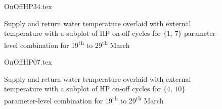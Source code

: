 \begin{figure}[htb]
    \centering
    {OnOffHP34.tex}
    \vspace*{-1.8\baselineskip}
    \caption[Supply and return water temperature, outdoor temperature and \acs{HP} on/off cycling for $\{1\text{, }7\}$]{Supply and return water temperature overlaid with external temperature with a subplot of \acs{HP} on-off cycles for $\{1\text{, }7\}$ parameter-level combination for 19\textsuperscript{th} to 29\textsuperscript{th} March}
    \label{fig:onoffhp34}
\end{figure}

\begin{figure}[htb]
    \centering
    {OnOffHP07.tex}
    \vspace*{-1.8\baselineskip}
    \caption[Supply and return water temperature, outdoor temperature and \acs{HP} on/off cycling for $\{4\text{, }10\}$]{Supply and return water temperature overlaid with external temperature with a subplot of \acs{HP} on-off cycles for $\{4\text{, }10\}$ parameter-level combination for 19\textsuperscript{th} to 29\textsuperscript{th} March}
    \label{fig:onoffhp07}
\end{figure}


